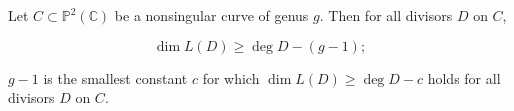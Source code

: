 Let $C \subset \mathbb{P}^2(\mathbb{C})$ be a nonsingular curve of genus $g$. Then for all divisors $D$ on $C$,

$$\dim L(D) \geq \deg D - (g - 1);$$

$g - 1$ is the smallest constant $c$ for which $\dim L(D) \geq \deg D - c$ holds for all divisors $D$ on $C$.
